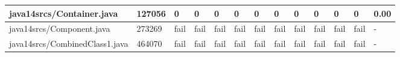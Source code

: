\begin{tabular}{|l|l|l|l|l|l|l|l|l|l|l|l|l|}
\hline
java14srcs/Container.java                          & 127056      & 0         & 0         & 0         & 0         & 0         & 0         & 0         & 0         & 0         & 0         & 0.00      \\
\hline
java14srcs/Component.java                          & 273269      & fail      & fail      & fail      & fail      & fail      & fail      & fail      & fail      & fail      & fail      & -         \\
\hline
java14srcs/CombinedClass1.java                     & 464070      & fail      & fail      & fail      & fail      & fail      & fail      & fail      & fail      & fail      & fail      & -         \\
\hline
\end{tabular}